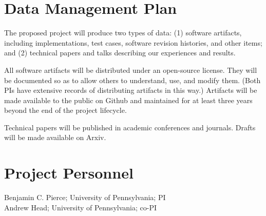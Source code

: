 \section*{Data Management Plan}

The proposed project will produce two types of data: (1) software artifacts,
including implementations, test cases, software revision histories, and
other items; and (2) technical papers and talks describing our experiences
and results.

All software artifacts will be distributed under an open-source
license.  They will be documented so as to allow others to understand,
use, and modify them.  (Both PIs have extensive records of
distributing artifacts in this way.)  Artifacts will be made available
to the public on Github and maintained for at least three years beyond
the end of the project lifecycle.

Technical papers will be published in academic conferences and journals.
Drafts will be made available on Arxiv.

\newpage
\section*{Project Personnel}

Benjamin C. Pierce; University of Pennsylvania; PI \\
Andrew Head; University of Pennsylvania; co-PI
